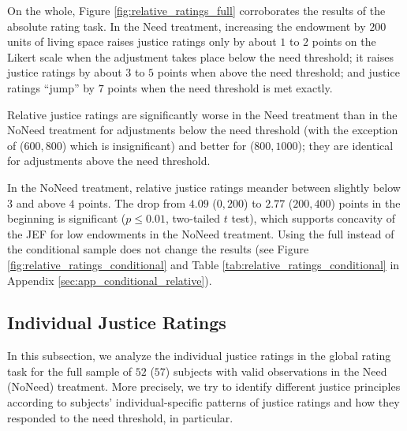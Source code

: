 \documentclass[12pt]{scrartcl}
\begin{document}
On the whole, Figure \ref{fig:relative_ratings_full} corroborates the results of the absolute rating task.
In the Need treatment, increasing the endowment by $200$ units of living space raises justice ratings only by about $1$ to $2$ points on the Likert scale when the adjustment takes place below the need threshold; it raises justice ratings by about $3$ to $5$ points when above the need threshold; and justice ratings ``jump'' by $7$ points when the need threshold is met exactly.

Relative justice ratings are significantly worse in the Need treatment than in the NoNeed treatment for adjustments below the need threshold (with the exception of ($600,800$) which is insignificant) and better for ($800,1000$); they are identical for adjustments above the need threshold.

In the NoNeed treatment, relative justice ratings meander between slightly below $3$ and above $4$ points.
The drop from $4.09$ ($0,200$) to $2.77$ ($200,400$) points in the beginning is significant ($p\le 0.01$, two-tailed $t$ test), which supports concavity of the JEF for low endowments in the NoNeed treatment.
Using the full instead of the conditional sample does not change the results (see Figure \ref{fig:relative_ratings_conditional} and Table \ref{tab:relative_ratings_conditional} in Appendix \ref{sec:app_conditional_relative}).


\subsection{Individual Justice Ratings}\label{sec:individual}
\noindent In this subsection, we analyze the individual justice ratings in the global rating task for the full sample of $52$ ($57$) subjects with valid observations in the Need (NoNeed) treatment.
More precisely, we try to identify different justice principles according to subjects' individual-specific patterns of justice ratings and how they responded to the need threshold, in particular.
\end{document}
